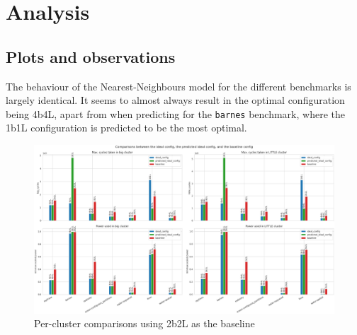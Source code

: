 \section{Analysis}
    \subsection{Plots and observations}
    The behaviour of the Nearest-Neighbours model for the different benchmarks 
    is largely identical. It seems to almost always result in the optimal 
    configuration being 4b4L, apart from when predicting for the \texttt{barnes}
    benchmark, where the 1b1L configuration is predicted to be the most optimal.
    \begin{figure}[H]
        \centering
        \includegraphics[width=\textwidth]{result-plots/stock-2b2L/clusters-bars.png}
        \caption{Per-cluster comparisons using 2b2L as the baseline}
        \label{fig:clusters-bars}
    \end{figure}
    
